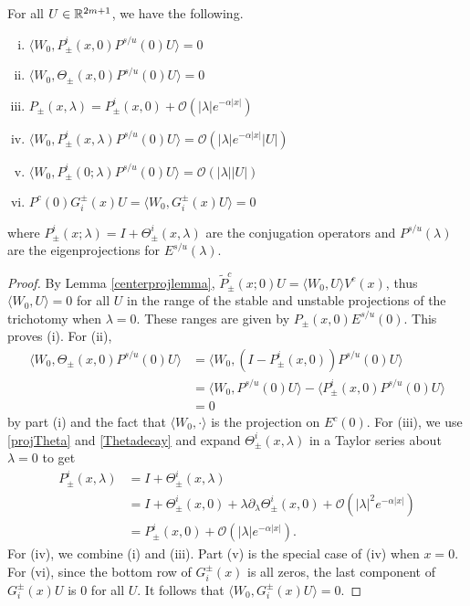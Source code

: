 \documentclass[thesis.tex]{subfiles}
\begin{document}
\begin{lemma}\label{W0projlemma}
For all $U \in \mathbb{R}^{2m+1}$, we have the following.
\begin{enumerate}[(i)]
	\item $\langle W_0, P^i_\pm(x, 0) P^{s/u}(0) U \rangle = 0$
	\item $\langle W_0, \Theta_\pm(x, 0) P^{s/u}(0) U \rangle = 0$
	\item $P_\pm(x, \lambda) = P^i_\pm(x, 0) + \mathcal{O}(|\lambda|e^{-\alpha|x|})$
	\item $\langle W_0, P^i_\pm(x, \lambda) P^{s/u}(0) U \rangle = \mathcal{O}(|\lambda|e^{-\alpha|x|}|U|)$
	\item $\langle W_0, P^i_\pm(0; \lambda) P^{s/u}(0) U \rangle = \mathcal{O}(|\lambda||U|)$
	\item $P^c(0) G_i^\pm(x) U = \langle W_0, G_i^\pm(x) U\rangle = 0$
\end{enumerate}
where $P^i_\pm(x; \lambda) = I + \Theta^i_\pm(x, \lambda)$ are the conjugation operators and $P^{s/u}(\lambda)$ are the eigenprojections for $E^{s/u}(\lambda)$.
\begin{proof}
By Lemma \ref{centerprojlemma}, $\tilde{P}_\pm^c(x; 0)U = \langle W_0, U \rangle V^c(x)$, thus $\langle W_0, U \rangle = 0$ for all $U$ in the range of the stable and unstable projections of the trichotomy when $\lambda = 0$. These ranges are given by $P_\pm(x, 0) E^{s/u}(0)$. This proves (i). For (ii), 
\begin{align*}
\langle W_0, \Theta_\pm(x, 0) P^{s/u}(0) U\rangle &=
\langle W_0, (I - P^i_\pm(x, 0)) P^{s/u}(0) U\rangle \\
&= \langle W_0, P^{s/u}(0) U \rangle - \langle P^i_\pm(x, 0)P^{s/u}(0) U \rangle \\
&= 0
\end{align*}
by part (i) and the fact that $\langle W_0, \cdot \rangle$ is the projection on $E^c(0)$. For (iii), we use \cref{projTheta} and \cref{Thetadecay} and expand $\Theta^i_\pm(x, \lambda)$ in a Taylor series about $\lambda = 0$ to get
\begin{align*}
P^i_\pm(x, \lambda) &= I + \Theta^i_\pm(x, \lambda) \\
&= I + \Theta^i_\pm(x, 0) + \lambda \partial_\lambda \Theta^i_\pm(x, 0) + \mathcal{O}(|\lambda|^2 e^{-\alpha |x|} ) \\
&= P^i_\pm(x, 0) + \mathcal{O}(|\lambda|e^{-\alpha|x|}).
\end{align*}
For (iv), we combine (i) and (iii). Part (v) is the special case of (iv) when $x = 0$. For (vi), since the bottom row of $G_i^\pm(x)$ is all zeros, the last component of $G_i^\pm(x) U$ is 0 for all $U$. It follows that $\langle W_0, G_i^\pm(x) U\rangle = 0$. 
\end{proof}
\end{lemma}

\iffulldocument\else
	
	
\fi
\end{document}
